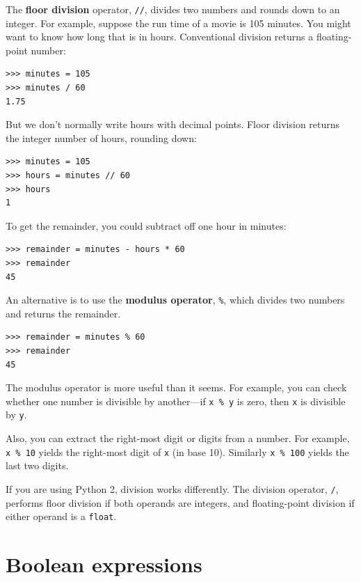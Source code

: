 \documentclass[10pt]{book}
\begin{document}
The {\bf floor division} operator, \verb"//", divides
two numbers and rounds down to an integer.  For example, suppose the
run time of a movie is 105 minutes.  You might want to know how
long that is in hours.  Conventional division
returns a floating-point number:

\begin{verbatim}
>>> minutes = 105
>>> minutes / 60
1.75
\end{verbatim}

But we don't normally write hours with decimal points.  Floor
division returns the integer number of hours, rounding down:

\begin{verbatim}
>>> minutes = 105
>>> hours = minutes // 60
>>> hours
1
\end{verbatim}

To get the remainder, you could subtract off one hour in minutes:

\begin{verbatim}
>>> remainder = minutes - hours * 60
>>> remainder
45
\end{verbatim}


An alternative is to use the {\bf modulus operator}, \verb"%", which
divides two numbers and returns the remainder.

\begin{verbatim}
>>> remainder = minutes % 60
>>> remainder
45
\end{verbatim}
%
The modulus operator is more useful than it seems.  For
example, you can check whether one number is divisible by another---if
{\tt x \% y} is zero, then {\tt x} is divisible by {\tt y}.

Also, you can extract the right-most digit
or digits from a number.  For example, {\tt x \% 10} yields the
right-most digit of {\tt x} (in base 10).  Similarly {\tt x \% 100}
yields the last two digits.

If you are using Python 2, division works differently.  The
division operator, \verb"/", performs floor division if both
operands are integers, and floating-point division if either
operand is a {\tt float}.


\section{Boolean expressions}
\end{document}

